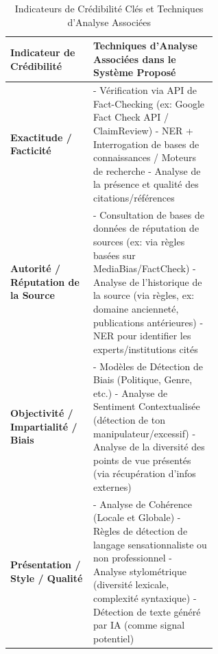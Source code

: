 \documentclass[9pt,twocolumn,french]{article}
\begin{document}
\begin{table}[htbp]
  \centering
  \caption{Indicateurs de Crédibilité Clés et Techniques d'Analyse Associées}
  \label{tab:credibility_indicators}
  \begin{tabular}{@{}lp{0.6\linewidth}@{}}
    \toprule
    Indicateur de Crédibilité & Techniques d'Analyse Associées dans le Système Proposé \\
    \midrule
    \textbf{Exactitude / Facticité} \citep{Pescuma2025, Rieh2014Credibility} & - Vérification via API de Fact-Checking (ex: Google Fact Check API / ClaimReview) \citep{schema_claimreview, Google2026Fact} \newline - NER + Interrogation de bases de connaissances / Moteurs de recherche \citep{Sharma2021Combating} \newline - Analyse de la présence et qualité des citations/références \citep{Oshikawa2019A} \\
    \addlinespace
    \textbf{Autorité / Réputation de la Source} \citep{Pescuma2025, Rieh2014Credibility} & - Consultation de bases de données de réputation de sources (ex: via règles basées sur MediaBias/FactCheck) \citep{Pescuma2025} \newline - Analyse de l'historique de la source (via règles, ex: domaine ancienneté, publications antérieures) \newline - NER pour identifier les experts/institutions cités \citep{Sharma2021Combating} \\
    \addlinespace
    \textbf{Objectivité / Impartialité / Biais} \citep{Pescuma2025, Rieh2014Credibility} & - Modèles de Détection de Biais (Politique, Genre, etc.) \citep{Shah2024Decoding, Menzner2018Biasscanner, Chen2019Detecting, Krieger2021} \newline - Analyse de Sentiment Contextualisée (détection de ton manipulateur/excessif) \citep{Ahmed2025Aidriven} \newline - Analyse de la diversité des points de vue présentés (via récupération d'infos externes) \\
    \addlinespace
    \textbf{Présentation / Style / Qualité} \citep{Rieh2014Credibility} & - Analyse de Cohérence (Locale et Globale) \citep{Willems2020Modeling, Barzilay2008} \newline - Règles de détection de langage sensationnaliste ou non professionnel \citep{Metzger2010} \newline - Analyse stylométrique (diversité lexicale, complexité syntaxique) \citep{Ahmed2025Aidriven} \newline - Détection de texte généré par IA (comme signal potentiel) \citep{Loth2024, Oshikawa2019A} \\

\end{tabular}
\end{table}
\end{document}
